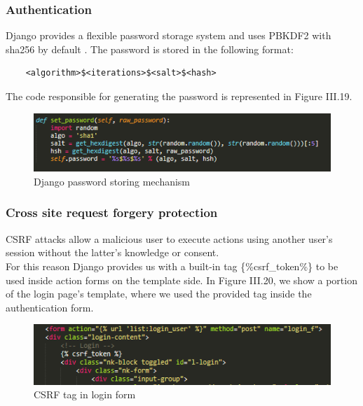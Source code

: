 \subsubsection{Authentication}
Django provides a flexible password storage system and uses PBKDF2 with sha256 by default \cite{dj_auth}. The password is stored in the following format:
\begin{verbatim}
    <algorithm>$<iterations>$<salt>$<hash>
\end{verbatim}
The code responsible for generating the password is represented in Figure III.19.
\begin{figure}[H]
\centering
\includegraphics[width=0.8\columnwidth]{Figures/password_storage.png}
\caption{Django password storing mechanism}
\end{figure}

\subsubsection{Cross site request forgery protection}
CSRF attacks allow a malicious user to execute actions using another user's session without the latter’s knowledge or consent.\\
For this reason Django provides us with a built-in tag \{\%csrf\_token\%\} to be used inside action forms on the template side. In Figure III.20, we show a portion of the login page's template, where we used the provided tag inside the authentication form.
\begin{figure}[H]
\centering
\includegraphics[width=0.8\columnwidth]{Figures/csrf.png}
\caption{CSRF tag in login form}
\end{figure}

